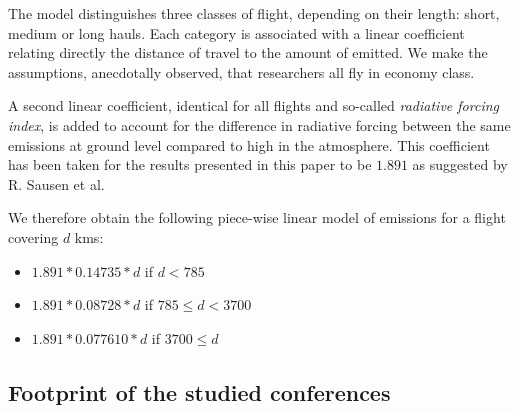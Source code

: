 The model distinguishes three classes of flight, depending on their length:
short, medium or long hauls. Each category is associated with a linear
coefficient relating directly the distance of travel to the amount of \gaz
emitted. We make the assumptions, anecdotally observed, that researchers all
fly in economy class.

A second linear coefficient, identical for all flights and so-called
\emph{radiative forcing index}, is added to account for the difference in
radiative forcing between the same emissions at ground level compared to high in
the atmosphere. This coefficient has been taken for the results presented in this
paper to be $1.891$ as suggested by R. Sausen et al.~\cite{Sausen05}

We therefore obtain the following piece-wise linear model of emissions for a flight covering $d$ kms:
\begin{itemize}
\item $1.891 * 0.14735 * d$ \gazunit if $d < 785$
\item $1.891 * 0.08728 * d$ \gazunit if $785 \leq d < 3700$
\item $1.891 * 0.077610 * d$ \gazunit if $3700\leq d  $
\end{itemize}



\subsection{Footprint of the studied conferences}

